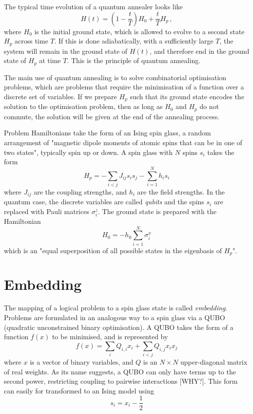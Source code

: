 \documentclass[aps,pra,10pt,twocolumn]{revtex4-2}
\begin{document}
The typical time evolution of a quantum annealer looks like
\begin{equation}
    H(t)=\left(1- \frac{t}{T}\right)H_0 + \frac{t}{T}H_p \,,
    \label{eq:time-evolution}
\end{equation}
where $H_0$ is the initial ground state, which is allowed to evolve to a second state $H_p$ across time $T$. If this is done adiabatically, with a sufficiently large $T$, the system will remain in the ground state of $H(t)$, and therefore end in the ground state of $H_p$ at time $T$. This is the principle of quantum annealing.

The main use of quantum annealing is to solve combinatorial optimisation problems, which are problems that require the minimisation of a function over a discrete set of variables. If we prepare $H_p$ such that its ground state encodes the solution to the optimisation problem, then as long as $H_0$ and $H_p$ do not commute, the solution will be given at the end of the annealing process.

Problem Hamiltonians take the form of an Ising spin glass, a random arrangement of "magnetic dipole moments of atomic spins that can be in one of two states", typically spin up or down. A spin glass with $N$ spins $s_i$ takes the form
\begin{equation}
    H_p = -\sum_{i<j}J_{ij}s_i s_j - \sum_{i=1}^{N}h_i s_i
    \label{eq:ising}
\end{equation}
where $J_{ij}$ are the coupling strengths, and $h_i$ are the field strengths. In the quantum case, the discrete variables are called \textit{qubits} and the spins $s_i$ are replaced with Pauli matrices $\sigma_i^z$. The ground state is prepared with the Hamiltonian
\begin{equation}
    H_0 = -h_0\sum_{i=1}^{N}\sigma_i^x
\end{equation}
which is an "equal superposition of all possible states in the eigenbasis of $H_p$".

\section{Embedding}

The mapping of a logical problem to a spin glass state is called \textit{embedding}. Problems are formulated in an analogous way to a spin glass via a QUBO (quadratic unconstrained binary optimisation). A QUBO takes the form of a function $f(x)$ to be minimised, and is represented by
\begin{equation}
    f(x)=\sum_iQ_{i,i}x_i+\sum_{i<j}Q_{i,j}x_ix_j
    \label{eq:QUBO}
\end{equation}
where $x$ is a vector of binary variables, and $Q$ is an $N\times N$ upper-diagonal matrix of real weights. As its name suggests, a QUBO can only have terms up to the second power, restricting coupling to pairwise interactions [WHY?].
This form can easily for transformed to an Ising model using
\begin{equation}
    s_i = x_i - \frac{1}{2}
    \label{eq:qubo-ising}
\end{equation}
\end{document}

